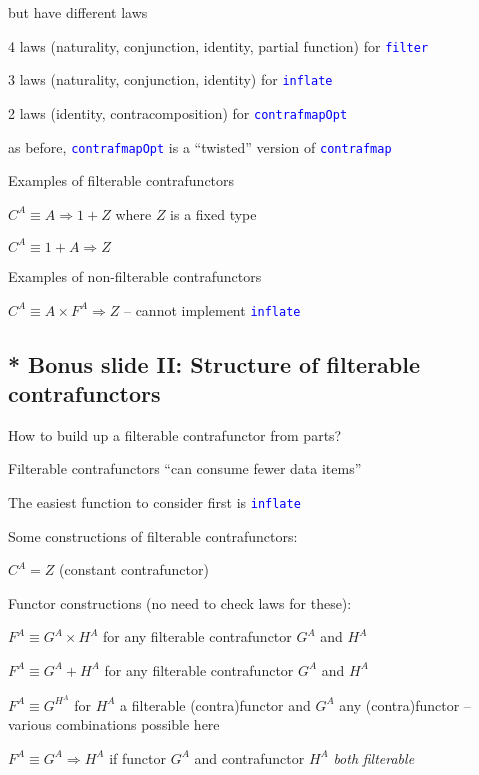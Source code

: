 but have different laws

4 laws (naturality, conjunction, identity, partial function) for \texttt{\textcolor{blue}{\footnotesize{}filter}} 

3 laws (naturality, conjunction, identity) for \texttt{\textcolor{blue}{\footnotesize{}inflate}} 

2 laws (identity, contracomposition) for \texttt{\textcolor{blue}{\footnotesize{}contrafmapOpt}} 

as before, \texttt{\textcolor{blue}{\footnotesize{}contrafmapOpt}}
is a ``twisted'' version of \texttt{\textcolor{blue}{\footnotesize{}contrafmap}} 

Examples of filterable contrafunctors

$C^{A}\equiv A\Rightarrow1+Z$ where $Z$ is a fixed type

$C^{A}\equiv1+A\Rightarrow Z$

Examples of non-filterable contrafunctors

$C^{A}\equiv A\times F^{A}\Rightarrow Z$ – cannot implement \texttt{\textcolor{blue}{\footnotesize{}inflate}} 


\subsection{{*} Bonus slide II: Structure of filterable contrafunctors}

How to build up a filterable contrafunctor from parts?

Filterable contrafunctors ``can consume fewer data items''

The easiest function to consider first is \texttt{\textcolor{blue}{\footnotesize{}inflate}} 

Some constructions of filterable contrafunctors:

$C^{A}=Z$ (constant contrafunctor)

Functor constructions (no need to check laws for these): 

$F^{A}\equiv G^{A}\times H^{A}$ for any filterable contrafunctor
$G^{A}$ and $H^{A}$

$F^{A}\equiv G^{A}+H^{A}$ for any filterable contrafunctor $G^{A}$
and $H^{A}$

$F^{A}\equiv G^{H^{A}}$ for $H^{A}$ a filterable (contra)functor
and $G^{A}$ any (contra)functor – various combinations possible here

$F^{A}\equiv G^{A}\Rightarrow H^{A}$ if\emph{ }functor $G^{A}$ and
contrafunctor $H^{A}$ \emph{both} \emph{filterable}

